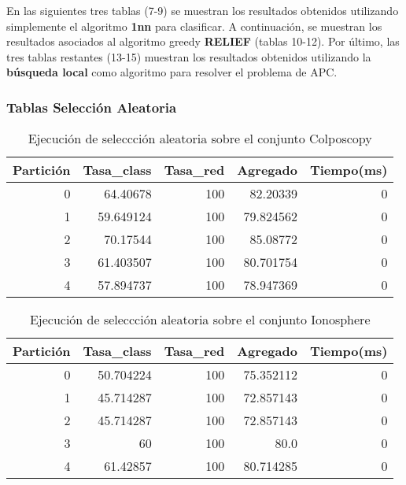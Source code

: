 \documentclass[size=a4, parskip=half, titlepage=false, toc=flat, toc=bib, 12pt]{scrartcl}
\begin{document}
En las siguientes tres tablas (7-9) se muestran los resultados obtenidos utilizando simplemente el algoritmo \textbf{1nn} para clasificar. A continuación, se muestran los resultados asociados al algoritmo greedy \textbf{RELIEF} (tablas 10-12). Por último, las tres tablas restantes (13-15) muestran los resultados obtenidos utilizando la \textbf{búsqueda local} como algoritmo para resolver el problema de APC.

\newpage
\subsubsection{Tablas Selección Aleatoria}

 \begin{table}[ht]
  \centering
  \begin{tabular}[t]{rrrrr}
  \toprule
  Partición &Tasa\_class &Tasa\_red & Agregado & Tiempo(ms)\\
  \midrule
0         & 64.40678  & 100        & 82.20339  & 0      \\
1         & 59.649124 & 100        & 79.824562 & 0      \\
2         & 70.17544  & 100        & 85.08772  & 0      \\
3         & 61.403507 & 100        & 80.701754 & 0      \\
4         & 57.894737 & 100        & 78.947369 & 0      \\
  \bottomrule
  \end{tabular}
  \caption{Ejecución de seleccción aleatoria sobre el conjunto Colposcopy }
  \end{table}%

 \begin{table}[ht]
  \centering
  \begin{tabular}[t]{rrrrr}
  \toprule
  Partición &Tasa\_class &Tasa\_red & Agregado & Tiempo(ms)\\
  \midrule
0         & 50.704224 & 100        & 75.352112 & 0      \\
1         & 45.714287 & 100        & 72.857143 & 0      \\
2         & 45.714287 & 100        & 72.857143 & 0      \\
3         & 60        & 100        & 80.0      & 0      \\
4         & 61.42857  & 100        & 80.714285 & 0      \\
  \bottomrule
  \end{tabular}
  \caption{Ejecución de seleccción aleatoria sobre el conjunto Ionosphere}
  \end{table}%
\end{document}

